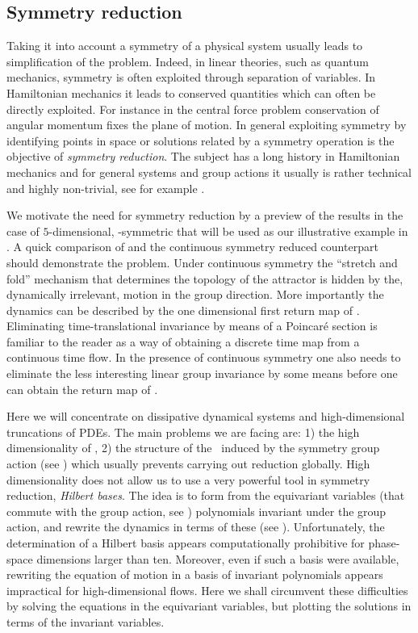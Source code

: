 \subsection{Symmetry reduction}

Taking it into account  a symmetry of a physical system
usually leads to simplification of the problem.
Indeed, in linear theories, such as quantum mechanics, symmetry is often exploited
through separation of variables. In Hamiltonian mechanics it leads to conserved quantities which can often be
directly exploited. For instance in the central force problem conservation of angular momentum fixes the plane
of motion.
In general exploiting symmetry by identifying points in space or solutions
related by a symmetry operation is the objective of
\emph{symmetry reduction}. The subject has a long history in Hamiltonian mechanics and for general systems
and group actions it usually is rather technical and highly non-trivial, see for example
.

We motivate the need for symmetry reduction by a preview of the results in the case of $5$-dimensional,
-symmetric {\CLe} that will be used as our illustrative example in .
 A quick comparison of
 and the continuous symmetry reduced  counterpart should demonstrate the problem.
Under continuous symmetry the ``stretch and fold'' mechanism that determines the topology of the attractor
is hidden by the, dynamically irrelevant, motion in the group direction. More importantly the dynamics can
be described by the one dimensional first return map of . Eliminating time-translational
invariance by means of a Poincar\'e section is familiar to the reader as a way of obtaining a discrete time map from
a continuous time flow. In the presence of continuous symmetry one also needs to eliminate the less interesting
linear group invariance by some means before one can obtain the return map of .

Here we will concentrate on dissipative dynamical systems and high-dimensional truncations
of PDEs. The main problems we are facing are: 1) the high dimensionality of \statesp, 2) the structure of
the \statesp\ induced by the symmetry group action (see )
which usually prevents carrying out reduction globally.
High dimensionality does not allow us to use a very powerful
tool in symmetry reduction, \emph{Hilbert bases}.
The idea is to form from the equivariant variables
(that commute
with the group action, see )
polynomials invariant under the group action, and rewrite the
dynamics in terms of these (see ).
Unfortunately, the determination of a Hilbert basis appears
computationally prohibitive for phase-space dimensions
larger than ten. Moreover, even
if such a basis were available, rewriting the equation of
motion in a basis of invariant polynomials appears
impractical for high-dimensional flows.
Here we shall circumvent these difficulties by solving the
equations in the equivariant variables, but plotting the
solutions in terms of the invariant variables.

